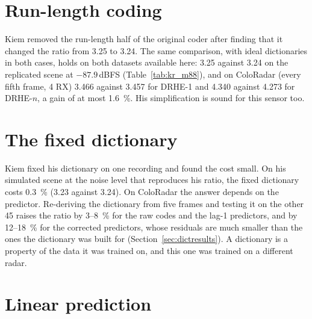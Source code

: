 \section{Run-length coding}
\label{sec:kc_rle}

Kiem removed the run-length half of the original coder after finding that it
changed the ratio from 3.25 to 3.24. The same comparison, with ideal
dictionaries in both cases, holds on both datasets available here: 3.25
against 3.24 on the replicated scene at $-87.9$\,dBFS
(Table~\ref{tab:kr_m88}), and on ColoRadar (every fifth frame, 4 RX) 3.466
against 3.457 for DRHE-1 and 4.340 against 4.273 for DRHE-$n$, a gain of at
most \SI{1.6}{\percent}. His simplification is sound for this sensor too.

\section{The fixed dictionary}
\label{sec:kc_dict}

Kiem fixed his dictionary on one recording and found the cost small. On his
simulated scene at the noise level that reproduces his ratio, the fixed
dictionary costs \SI{0.3}{\percent} (3.23 against 3.24). On ColoRadar the
answer depends on the predictor. Re-deriving the dictionary from five frames and
testing it on the other 45 raises the ratio by 3--\SI{8}{\percent} for the raw
codes and the lag-1 predictors, and by 12--\SI{18}{\percent} for the corrected
predictors, whose residuals are much smaller than the ones the dictionary was
built for (Section~\ref{sec:dictresults}). A dictionary is a
property of the data it was trained on, and this one was trained on a
different radar.

\section{Linear prediction}
\label{sec:kc_lpc}

